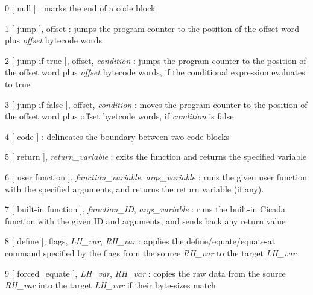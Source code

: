 \documentclass{article}
\begin{document}
\begin{description}
\item{0  [ null ]} :  marks the end of a code block

\item{1  [ jump ], offset} : jumps the program counter to the position of the offset word plus \emph{offset} bytecode words
\item{2  [ jump-if-true ], offset, \emph{condition}} : jumps the program counter to the position of the offset word plus \emph{offset} bytecode words, if the conditional expression evaluates to true
\item{3  [ jump-if-false ], offset, \emph{condition}} : moves the program counter to the position of the offset word plus offset byetcode words, if \emph{condition} is false

\item{4  [ code ]} : delineates the boundary between two code blocks
\item{5  [ return ], \emph{return\_variable}} :  exits the function and returns the specified variable
\item{6  [ user function ], \emph{function\_variable}, \emph{args\_variable}} : runs the given user function with the specified arguments, and returns the return variable (if any).
\item{7  [ built-in function ], \emph{function\_ID}, \emph{args\_variable}} : runs the built-in Cicada function with the given ID and arguments, and sends back any return value

\item{8  [ define ], flags, \emph{LH\_var}, \emph{RH\_var}} : applies the define/equate/equate-at command specified by the flags from the source \emph{RH\_var} to the target \emph{LH\_var}
\item{9  [ forced\_equate ], \emph{LH\_var}, \emph{RH\_var}} : copies the raw data from the source \emph{RH\_var} into the target \emph{LH\_var} if their byte-sizes match


\end{description}
\end{document}
